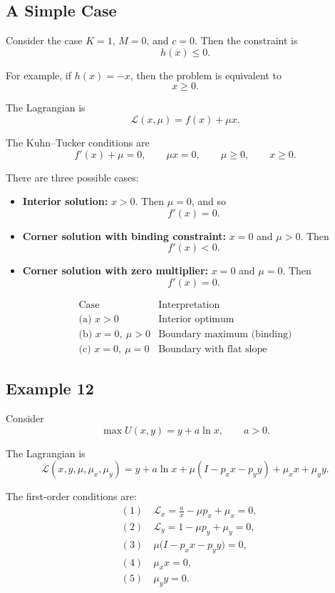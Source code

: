 \subsection*{A Simple Case}

Consider the case $K=1$, $M=0$, and $c=0$. Then the constraint is
\[
h(x)\le 0.
\]

For example, if $h(x)=-x$, then the problem is equivalent to
\[
x \ge 0.
\]

The Lagrangian is
\[
\mathcal{L}(x,\mu)=f(x)+\mu x.
\]

The Kuhn--Tucker conditions are
\[
f'(x)+\mu=0,
\qquad
\mu x=0,
\qquad
\mu \ge 0,
\qquad
x\ge 0.
\]

There are three possible cases:

\begin{itemize}
    \item[(a)] \textbf{Interior solution:} $x>0$.  
    Then $\mu=0$, and so
    \[
    f'(x)=0.
    \]

    \item[(b)] \textbf{Corner solution with binding constraint:} $x=0$ and $\mu>0$.  
    Then
    \[
    f'(x)<0.
    \]

    \item[(c)] \textbf{Corner solution with zero multiplier:} $x=0$ and $\mu=0$.  
    Then
    \[
    f'(x)=0.
    \]
\end{itemize}

\[
\begin{array}{c|c}
\text{Case} & \text{Interpretation} \\
\hline
\text{(a) } x>0 & \text{Interior optimum} \\
\text{(b) } x=0,\ \mu>0 & \text{Boundary maximum (binding)} \\
\text{(c) } x=0,\ \mu=0 & \text{Boundary with flat slope}
\end{array}
\]

\subsection*{Example 12}

Consider
\[
\max U(x,y)= y + a\ln x,
\qquad a>0.
\]

The Lagrangian is
\[
\mathcal{L}(x,y,\mu,\mu_x,\mu_y)
=
y + a\ln x
+
\mu( I - p_x x - p_y y )
+
\mu_x x
+
\mu_y y.
\]



The first-order conditions are:
\[
\begin{aligned}
&(1)\quad \mathcal{L}_x = \frac{a}{x} - \mu p_x + \mu_x = 0,\\
&(2)\quad \mathcal{L}_y = 1 - \mu p_y + \mu_y = 0,\\
&(3)\quad \mu \bigl(I - p_x x - p_y y\bigr) = 0,\\
&(4)\quad \mu_x x = 0,\\
&(5)\quad \mu_y y = 0.
\end{aligned}
\]


